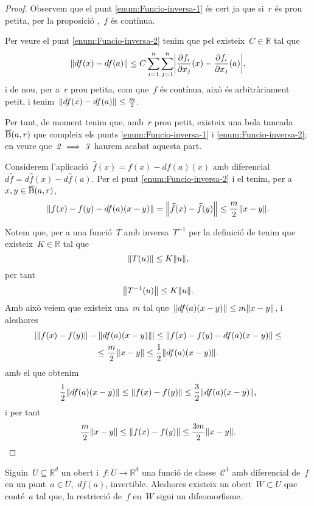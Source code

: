 \documentclass[../../main.tex]{subfiles}
\begin{document}
    \begin{proof}
        Observem que el punt \eqref{enum:Funcio-inversa-1} és cert ja que si~\(r\) és prou petita, per la proposició ,~\(f\) és contínua.

        Per veure el punt \eqref{enum:Funcio-inversa-2} tenim que pel  existeix~\(C\in\mathbb{R}\) tal que
        \[
            \norm{df(x)-df(a)}\leq C\sum_{i=1}^{n}\sum_{j=1}^{n}\abs{\frac{\partial f_{i}}{\partial x_{j}}(x)-\frac{\partial f_{i}}{\partial x_{j}}(a)},
        \]
        i de nou, per a~\(r\) prou petita, com que~\(f\) és contínua, això és arbitràriament petit, i tenim~\(\norm{df(x)-df(a)}\leq\frac{m}{2}\).

        Per tant, de moment tenim que, amb~\(r\) prou petit, existeix una bola tancada~\(\overline{\operatorname{B}}(a,r)\) que compleix els punts \eqref{enum:Funcio-inversa-1} i \eqref{enum:Funcio-inversa-2}; en veure que~\(\mathit{2}\implies\mathit{3}\) haurem acabat aquesta part.

        Considerem l'aplicació~\(\widehat{f}(x)=f(x)-df(a)(x)\) amb diferencial~\(d\widehat{f}=d\widehat{f}(x)-d\widehat{f}(a)\).
        Per el punt \eqref{enum:Funcio-inversa-2} i el  tenim, per a~\(x,y\in\overline{\operatorname{B}}(a,r)\), %
        \[
            \norm{f(x)-f(y)-df(a)(x-y)}=\norm{\widehat{f}(x)-\widehat{f}(y)}\leq\frac{m}{2}\norm{x-y}.
        \]

        Notem que, per a una funció~\(T\) amb inversa~\(T^{-1}\) per la definició de  tenim que existeix~\(K\in\mathbb{R}\) tal que
        \[
            \norm{T(u)}\leq K\norm{u},
        \]
        per tant
        \[
            \norm{T^{-1}(u)}\leq K\norm{u}.
        \]
        Amb això veiem que existeix una~\(m\) tal que~\(\norm{df(a)(x-y)}\leq m\norm{x-y}\), i aleshores
        \begin{multline*}
        \abs{\norm{f(x)-f(y)}-\norm{df(a)(x-y)}}\leq\norm{f(x)-f(y)-df(a)(x-y)}\leq\\\leq\frac{m}{2}\norm{x-y}\leq\frac{1}{2}\norm{df(a)(x-y)}.
        \end{multline*}
        amb el que obtenim
        \[
            \frac{1}{2}\norm{df(a)(x-y)}\leq\norm{f(x)-f(y)}\leq\frac{3}{2}\norm{df(a)(x-y)},
        \]
        i per tant
        \[
            \frac{m}{2}\norm{x-y}\leq\norm{f(x)-f(y)}\leq\frac{3m}{2}\norm{x-y}.\qedhere
        \]
    \end{proof}
    \begin{theorem}
        \label{thm:Funcio-inversa}
        Siguin~\(U\subseteq\mathbb{R}^{d}\) un obert i~\(f\colon U\to\mathbb{R}^{d}\) una funció de classe~\(\mathcal{C}^{1}\) amb diferencial de~\(f\) en un punt~\(a\in U\),~\(df(a)\), invertible.
        Aleshores existeix un obert~\(W\subset U\) que conté~\(a\) tal que, la restricció de~\(f\) en~\(W\) sigui un difeomorfisme.
    \end{theorem}
\end{document}
